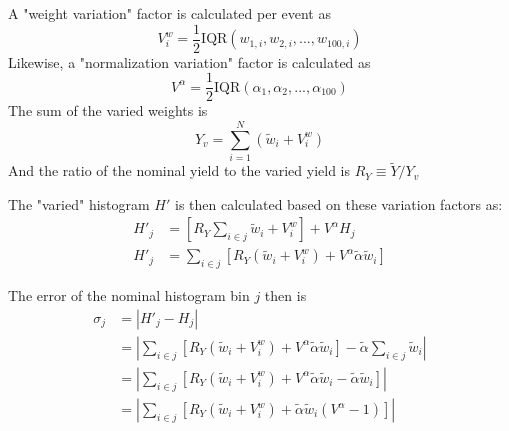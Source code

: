 A "weight variation" factor is calculated per event as 
    \begin{equation}
    V^w_i = \frac{1}{2}\textrm{IQR}(w_{1,i}, w_{2,i}, ..., w_{100,i})
    \end{equation}
Likewise, a "normalization variation" factor is calculated as
    \begin{equation}
    V^{\alpha} = \frac{1}{2}\textrm{IQR}(\alpha_{1}, \alpha_{2}, ..., \alpha_{100})
    \end{equation}
The sum of the varied weights is 
    \begin{equation}
    Y_v = \sum_{i=1}^{N} \left( \tilde w_i + V^w_i \right)
    \end{equation}
And the ratio of the nominal yield to the varied yield is $R_Y \equiv \tilde Y / Y_v$

The "varied" histogram $H'$ is then calculated based on these variation factors as:
    \begin{equation} \begin{split}
    H'_j &= \left[ R_Y \sum_{i \in j} \tilde w_i + V^w_i \right] + V^{\alpha} H_j
    \\H'_j &= \sum_{i \in j} \left[ R_Y \left( \tilde w_i + V^w_i \right)
        + V^{\alpha} \tilde \alpha \tilde w_i \right]
    \end{split} \end{equation}

The error of the nominal histogram bin $j$ then is
    \begin{equation} \begin{split}
    \sigma_j &= | H'_j - H_j |
    \\&= \left| \sum_{i \in j} \left[
        R_Y \left( \tilde w_i + V^w_i \right)
        + V^{\alpha} \tilde \alpha \tilde w_i \right] 
        -\tilde \alpha \sum_{i \in j} \tilde w_i \right|
    \\&= \left| \sum_{i \in j} \left[
        R_Y \left( \tilde w_i + V^w_i \right)
        + V^{\alpha} \tilde \alpha \tilde w_i 
        - \tilde \alpha \tilde w_i
        \right] \right|
    \\&= \left| \sum_{i \in j} \left[
        R_Y \left( \tilde w_i + V^w_i \right) 
        + \tilde \alpha \tilde w_i (V^{\alpha}-1) \right] \right|
    \end{split} \end{equation}




